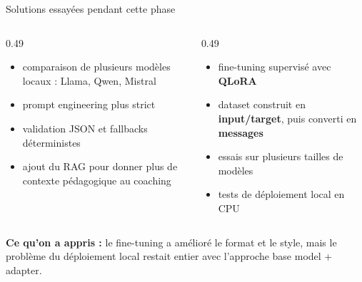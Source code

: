 ﻿\documentclass[10pt,aspectratio=169]{beamer}
\begin{document}
\begin{frame}{Solutions essayées pendant cette phase}
\begin{columns}[T]
\begin{column}{0.49\textwidth}
\begin{itemize}
    \item comparaison de plusieurs modèles locaux : Llama, Qwen, Mistral
    \item prompt engineering plus strict
    \item validation JSON et fallbacks déterministes
    \item ajout du RAG pour donner plus de contexte pédagogique au coaching
\end{itemize}
\end{column}
\begin{column}{0.49\textwidth}
\begin{itemize}
    \item fine-tuning supervisé avec \textbf{QLoRA}
    \item dataset construit en \textbf{input/target}, puis converti en \textbf{messages}
    \item essais sur plusieurs tailles de modèles
    \item tests de déploiement local en CPU
\end{itemize}
\end{column}
\end{columns}
\vspace{0.35cm}
\begin{tcolorbox}[colback=accent!8,colframe=accent!45]
\small \textbf{Ce qu'on a appris :} le fine-tuning a amélioré le format et le style, mais le problème du déploiement local restait entier avec l'approche base model + adapter.
\end{tcolorbox}
\end{frame}
\end{document}

